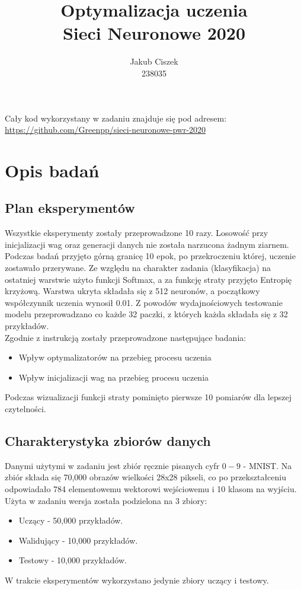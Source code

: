 \documentclass{article}
\title{  Optymalizacja uczenia\\Sieci Neuronowe 2020 }
\author{
  Jakub Ciszek \\
  238035\\
}
\begin{document}
\maketitle

\newpage
\tableofcontents
\newpage

Cały kod wykorzystany w zadaniu znajduje się pod adresem: \url{https://github.com/Greenpp/sieci-neuronowe-pwr-2020}

\section{Opis badań}
\subsection{Plan eksperymentów}

Wszystkie eksperymenty zostały przeprowadzone 10 razy. Losowość przy inicjalizacji wag oraz generacji danych nie została narzucona żadnym ziarnem. Podczas badań przyjęto górną granicę 10 epok, po przekroczeniu której, uczenie zostawało przerywane. Ze względu na charakter zadania (klasyfikacja) na ostatniej warstwie użyto funkcji Softmax, a za funkcję straty przyjęto Entropię krzyżową. Warstwa ukryta składała się z 512 neuronów, a początkowy współczynnik uczenia wynosił 0.01.
Z powodów wydajnościowych testowanie modelu przeprowadzano co każde 32 paczki, z których każda składała się z 32 przykładów.\\
Zgodnie z instrukcją zostały przeprowadzone następujące badania:
\begin{itemize}
	\item Wpływ optymalizatorów na przebieg procesu uczenia
	\item Wpływ inicjalizacji wag na przebieg procesu uczenia 
\end{itemize}
Podczas wizualizacji funkcji straty pominięto pierwsze 10 pomiarów dla lepszej czytelności.

\subsection{Charakterystyka zbiorów danych}

Danymi użytymi w zadaniu jest zbiór ręcznie pisanych cyfr \(0-9\) - MNIST. Na zbiór składa się 70,000 obrazów wielkości 28x28 pikseli, co po przekształceniu odpowiadało 784 elementowemu wektorowi wejściowemu i 10 klasom na wyjściu. Użyta w zadaniu wersja została podzielona na 3 zbiory:
\begin{itemize}
	\item Uczący - 50,000 przykładów.
	\item Walidujący - 10,000 przykładów.
	\item Testowy - 10,000 przykładów.
\end{itemize}
W trakcie eksperymentów wykorzystano jedynie zbiory uczący i testowy.
\end{document}
